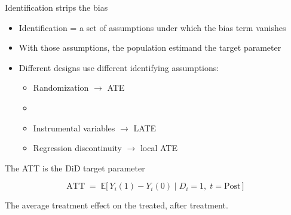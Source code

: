 \documentclass[aspectratio=169,11pt]{beamer}
\begin{document}
\begin{frame}{Identification strips the bias}
\vspace{0.4em}
\begin{itemize}
  \item Identification = a set of assumptions under which the bias term vanishes
  \item With those assumptions, the population estimand  the target parameter
  \item Different designs use different identifying assumptions:
  \begin{itemize}
    \item Randomization $\rightarrow$ ATE
    \item {}
    \item Instrumental variables $\rightarrow$ LATE
    \item Regression discontinuity $\rightarrow$ local ATE
  \end{itemize}
\end{itemize}
\end{frame}

\begin{frame}{The ATT is the DiD target parameter}
\vspace{1.5em}
\begin{center}
\Large
\[
\text{ATT} \;=\; \mathbb{E}\big[\, Y_i(1) - Y_i(0) \;\big|\; D_i = 1,\; t = \text{Post}\,\big]
\]
\end{center}
\vspace{1em}
\begin{center}
\color{charcoal}The average treatment effect on the treated, after treatment.
\end{center}
\vspace{0.6em}
\end{frame}
\end{document}
